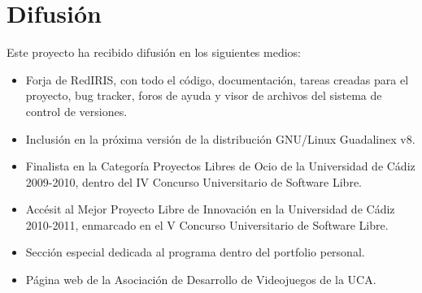 

\section{Difusión}

Este proyecto ha recibido difusión en los siguientes medios:
\begin{itemize}
    \item Forja de RedIRIS, con todo el código, documentación, tareas creadas para el proyecto, bug tracker, foros de ayuda y
            visor de archivos del sistema de control de versiones.
    \item Inclusión en la próxima versión de la distribución GNU/Linux Guadalinex v8.
    \item Finalista en la Categoría Proyectos Libres de Ocio de la Universidad de Cádiz 2009-2010, dentro del IV
            Concurso Universitario de Software Libre.
    \item Accésit al Mejor Proyecto Libre de Innovación en la Universidad de Cádiz 2010-2011, enmarcado en el V
            Concurso Universitario de Software Libre.
    \item Sección especial dedicada al programa dentro del portfolio personal.
    \item Página web de la Asociación de Desarrollo de Videojuegos de la UCA.
\end{itemize}
